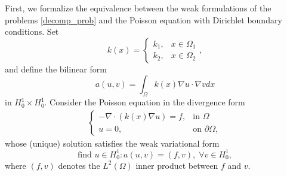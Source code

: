\documentclass[5p,authoryear]{elsarticle}
\begin{document}
First, we formalize the equivalence between the weak formulations of the problems \eqref{decomp_prob} and the Poisson equation with Dirichlet boundary conditions. Set
\[
    k(x) = \begin{cases}
    k_1,& x \in \Omega_1\\
    k_2,& x \in \Omega_2
\end{cases},
\]
and define the bilinear form
\[
    a(u,v)=\int_\Omega k(x)\nabla u \cdot \nabla v dx
\]
in \(H^1_0 \times H^1_0\). Consider the Poisson equation in the divergence form
\begin{align}\label{decomp_poisson}
    \begin{cases}
        -\nabla \cdot (k(x) \nabla u) = f, & \text{in }\Omega \\
        u = 0, & \text{on } \partial\Omega,
    \end{cases}
\end{align}
whose (unique) solution satisfies the weak variational form
\begin{equation}\label{weak_poisson}
    \text{find } u \in H^1_0: a(u,v) = (f, v), \; \forall v \in H^1_0,
\end{equation}
where \((f,v)\) denotes the \(L^2(\Omega)\) inner product between \(f\) and \(v\).
\end{document}
